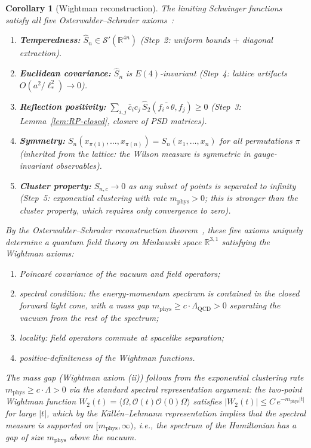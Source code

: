 \documentclass[11pt]{article}
\newtheorem{corollary}[theorem]{Corollary}
\theoremstyle{definition}
\newcommand{\R}{\mathbb{R}}
\newcommand{\Lam}{\Lambda_{\mathrm{QCD}}}
\begin{document}
\begin{corollary}[Wightman reconstruction]\label{cor:wightman}
The limiting Schwinger functions satisfy all five
Osterwalder--Schrader axioms~\cite{OS73}:

\begin{enumerate}[nosep,label=(OS\arabic*)]
\item \textbf{Temperedness:} $\hat S_n\in\mathcal{S}'(\R^{4n})$
(Step~2: uniform bounds $+$ diagonal extraction).
\item \textbf{Euclidean covariance:} $\hat S_n$ is $E(4)$-invariant
(Step~4: lattice artifacts $O(a^2/\ell_*^2)\to 0$).
\item \textbf{Reflection positivity:}
$\sum_{i,j}\bar c_i c_j\,\hat S_2(\overline{f_i\circ\theta},f_j)\ge 0$
(Step~3: Lemma~\ref{lem:RP-closed}, closure of PSD matrices).
\item \textbf{Symmetry:} $S_n(x_{\pi(1)},\ldots,x_{\pi(n)})
=S_n(x_1,\ldots,x_n)$ for all permutations $\pi$
(inherited from the lattice: the Wilson measure is symmetric
in gauge-invariant observables).
\item \textbf{Cluster property:} $S_{n,c}\to 0$ as any
subset of points is separated to infinity
(Step~5: exponential clustering with rate $m_{\mathrm{phys}}>0$;
this is \emph{stronger} than the cluster property, which
requires only convergence to zero).
\end{enumerate}

By the Osterwalder--Schrader reconstruction
theorem~\cite{OS73}, these five axioms uniquely determine
a quantum field theory on Minkowski space $\R^{3,1}$
satisfying the Wightman axioms:
\begin{enumerate}[nosep,label=(\roman*)]
\item Poincar\'e covariance of the vacuum and field operators;
\item spectral condition: the energy-momentum spectrum is contained in
the closed forward light cone, with a mass gap $m_{\mathrm{phys}}
\ge c\cdot\Lam>0$ separating the vacuum from the rest of the spectrum;
\item locality: field operators commute at spacelike separation;
\item positive-definiteness of the Wightman functions.
\end{enumerate}

The mass gap (Wightman axiom (ii)) follows from the exponential
clustering rate $m_{\mathrm{phys}}\ge c\cdot\Lambda>0$ via the
standard spectral representation argument:
the two-point Wightman function
$W_2(t)=\langle\Omega,\mathcal{O}(t)\mathcal{O}(0)\Omega\rangle$
satisfies $|W_2(t)|\le C\,e^{-m_{\mathrm{phys}}|t|}$ for
large $|t|$, which by the K\"all\'en--Lehmann representation implies
that the spectral measure is supported on $[m_{\mathrm{phys}},\infty)$,
i.e., the spectrum of the Hamiltonian has a gap of size
$m_{\mathrm{phys}}$ above the vacuum.
\end{corollary}
\end{document}
